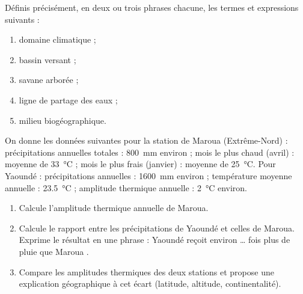 \documentclass[11pt]{article}
\newcounter{popsec}
\newcounter{popsub}
\newcommand{\courssub}[1]{%
  \stepcounter{popsub}%
  \par\vspace{9pt}\noindent{\popxbold\fontsize{11.5}{13}\selectfont\color{popink}{\color{poporange}\thepopsec.\thepopsub}\hspace{6pt}#1}\par\nopagebreak\vspace{4pt}
}
\begin{document}
\begin{exercice}[Définitions]
Définis précisément, en deux ou trois phrases chacune, les termes et expressions suivants :
\begin{enumerate}
\item domaine climatique ;
\item bassin versant ;
\item savane arborée ;
\item ligne de partage des eaux ;
\item milieu biogéographique.
\end{enumerate}
\end{exercice}

\begin{exercice}
On donne les données suivantes pour la station de Maroua (Extrême-Nord) : précipitations annuelles totales : \SI{800}{mm} environ ; mois le plus chaud (avril) : moyenne de \SI{33}{\celsius} ; mois le plus \og frais \fg{} (janvier) : moyenne de \SI{25}{\celsius}. Pour Yaoundé : précipitations annuelles : \SI{1600}{mm} environ ; température moyenne annuelle : \SI{23,5}{\celsius} ; amplitude thermique annuelle : \SI{2}{\celsius} environ.
\begin{enumerate}
\item Calcule l'amplitude thermique annuelle de Maroua.
\item Calcule le rapport entre les précipitations de Yaoundé et celles de Maroua. Exprime le résultat en une phrase : \og Yaoundé reçoit environ \ldots{} fois plus de pluie que Maroua \fg.
\item Compare les amplitudes thermiques des deux stations et propose une explication géographique à cet écart (latitude, altitude, continentalité).
\end{enumerate}
\end{exercice}

\courssub{Je m'entraîne}
\end{document}
